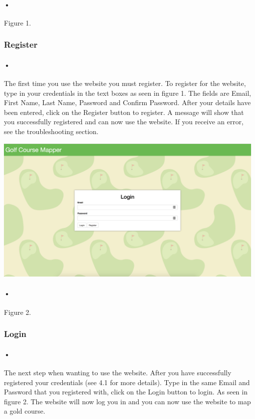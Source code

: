 \documentclass{article}
\begin{document}
	\paragraph{•}
    Figure 1.
	\subsubsection{Register}
	\paragraph{•}
	The first time you use the website you must register. To register for the website, type in your credentials in the text boxes as seen in figure 1. The fields are Email, First Name, Last Name, Password and Confirm Password. After your details have been entered, click on the Register button to register. A message will show that you successfully registered and can now use the website. If you receive an error, see the troubleshooting section.
	
		
	
	\includegraphics[scale=0.25]{Login}
	\paragraph{•}
    Figure 2.
	\subsubsection{Login}
	\paragraph{•}
	The next step when wanting to use the website. After you have successfully registered your credentials (see 4.1 for more details). Type in the same Email and Password that you registered with, click on the Login button to login. As seen in figure 2. The website will now log you in and you can now use the website to map a gold course.
	
\end{document}
